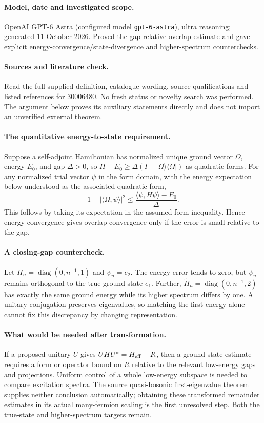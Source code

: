 \documentclass[11pt]{article}
\begin{document}
\paragraph{Model, date and investigated scope.}
OpenAI GPT-6 Astra (configured model \texttt{gpt-6-astra}), ultra reasoning; generated 11 October 2026. Proved the gap-relative overlap estimate and gave explicit energy-convergence/state-divergence and higher-spectrum counterchecks.

\paragraph{Sources and literature check.}
Read the full supplied definition, catalogue wording, source qualifications and listed references for 30006480. No fresh status or novelty search was performed. The argument below proves its auxiliary statements directly and does not import an unverified external theorem.

\paragraph{The quantitative energy-to-state requirement.} Suppose a self-adjoint Hamiltonian has normalized unique ground vector \(\Omega\), energy \(E_0\), and gap \(\Delta>0\), so \(H-E_0\geq\Delta(I-|\Omega\rangle\langle\Omega|)\) as quadratic forms. For any normalized trial vector \(\psi\) in the form domain, with the energy expectation below understood as the associated quadratic form,
\[
 1-|\langle\Omega,\psi\rangle|^2
 \leq\frac{\langle\psi,H\psi\rangle-E_0}{\Delta}.
\]
This follows by taking its expectation in the assumed form inequality. Hence energy convergence gives overlap convergence only if the error is small relative to the gap.
\paragraph{A closing-gap countercheck.} Let \(H_n=\operatorname{diag}(0,n^{-1},1)\) and \(\psi_n=e_2\). The energy error tends to zero, but \(\psi_n\) remains orthogonal to the true ground state \(e_1\). Further, \(\widetilde H_n=\operatorname{diag}(0,n^{-1},2)\) has exactly the same ground energy while its higher spectrum differs by one. A unitary conjugation preserves eigenvalues, so matching the first energy alone cannot fix this discrepancy by changing representation.
\paragraph{What would be needed after transformation.} If a proposed unitary \(U\) gives \(UHU^*=H_{\rm eff}+R\), then a ground-state estimate requires a form or operator bound on \(R\) relative to the relevant low-energy gaps and projections. Uniform control of a whole low-energy subspace is needed to compare excitation spectra. The source quasi-bosonic first-eigenvalue theorem supplies neither conclusion automatically; obtaining these transformed remainder estimates in its actual many-fermion scaling is the first unresolved step. Both the true-state and higher-spectrum targets remain.
\end{document}
